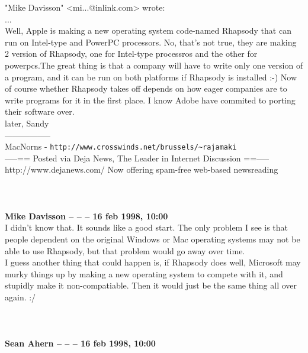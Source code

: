 \documentclass[11pt,twoside,a4paper]{article}
\begin{document}
\begin{multicols*}{2}
 "Mike Davisson" <mi...@inlink.com> wrote:~\\
...~\\

Well, Apple is making a new operating system code-named Rhapsody that can run on Intel-type and PowerPC processors. No, that's not true, they are making 2 version of Rhapsody, one for Intel-type processros and the other for powerpcs.The great thing is that a company will have to write only one version of a program, and it can be run on both platforms if Rhapsody is installed :-) Now of course whether Rhapsody takes off depends on how eager companies are to write programs for it in the first place. I know Adobe have commited to porting their software over.~\\

later, Sandy~\\
-----------------~\\
MacNorns - \texttt{http://www.crosswinds.net/brussels/\textasciitilde rajamaki}~\\

-----== Posted via Deja News, The Leader in Internet Discussion ==-----~\\
http://www.dejanews.com/   Now offering spam-free web-based newsreading~\\

 
		
	
		
~\\ ~\\ ~\\ \textbf{Mike Davisson -- -- -- 16 feb 1998, 10:00}~\\

I didn't know that.  It sounds like a good start. The only problem I see is that people dependent on the original Windows or Mac operating systems may not be able to use Rhapsody, but that problem would go away over time.~\\
I guess another thing that could happen is, if Rhapsody does well, Microsoft may murky things up by making a new operating system to compete with it, and stupidly make it non-compatiable.  Then it would just be the same thing all over again.  :/~\\


 
		
	
		
~\\ ~\\ ~\\ \textbf{Sean Ahern -- -- -- 16 feb 1998, 10:00}~\\


\end{multicols*}
\end{document}

